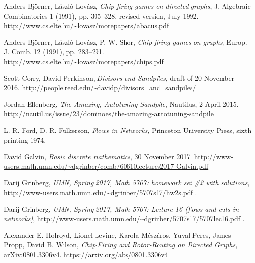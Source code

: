 \documentclass[numbers=enddot,12pt,final,onecolumn,notitlepage]{scrartcl}%
\theoremstyle{definition}
\begin{document}
\begin{thebibliography}{99999999}

Anders Bj\"orner, L\'aszl\'o Lov\'asz,
\textit{Chip-firing games on directed graphs},
J. Algebraic Combinatorics 1 (1991), pp. 305--328,
revised version, July 1992.
\newline\url{http://www.cs.elte.hu/~lovasz/morepapers/abacus.pdf}

Anders Bj\"orner, L\'aszl\'o Lov\'asz, P. W. Shor,
\textit{Chip-firing games on graphs},
Europ. J. Comb. 12 (1991), pp. 283--291.
\newline\url{http://www.cs.elte.hu/~lovasz/morepapers/chips.pdf}

Scott Corry, David Perkinson,
\textit{Divisors and Sandpiles},
draft of 20 November 2016.
\newline\url{http://people.reed.edu/~davidp/divisors_and_sandpiles/}

Jordan Ellenberg,
\textit{The Amazing, Autotuning Sandpile},
Nautilus, 2 April 2015.
\newline\url{http://nautil.us/issue/23/dominoes/the-amazing-autotuning-sandpile}

L. R. Ford, D. R. Fulkerson,
\textit{Flows in Networks},
Princeton University Press,
sixth printing 1974.

David Galvin, \textit{Basic discrete mathematics}, 30
November 2017.\newline
\url{http://www-users.math.umn.edu/~dgrinber/comb/60610lectures2017-Galvin.pdf}

Darij Grinberg,
\textit{UMN, Spring 2017, Math 5707: homework set \#2 with solutions},
\newline\url{http://www-users.math.umn.edu/~dgrinber/5707s17/hw2s.pdf} .

Darij Grinberg,
\textit{UMN, Spring 2017, Math 5707: Lecture 16 (flows and cuts in networks)},
\newline\url{http://www-users.math.umn.edu/~dgrinber/5707s17/5707lec16.pdf} .

Alexander E. Holroyd, Lionel Levine, Karola M\'esz\'aros,
Yuval Peres, James Propp, David B. Wilson,
\textit{Chip-Firing and Rotor-Routing on Directed Graphs},
arXiv:0801.3306v4.
\newline\url{https://arxiv.org/abs/0801.3306v4}


\end{thebibliography}
\end{document}
